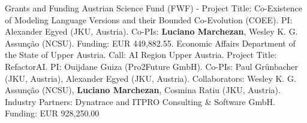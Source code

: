 \begin{rubric}{Grants and Funding}
\entry*[2025 -- 2029] Austrian Science Fund (FWF) - Project Title: Co-Existence of Modeling Language Versions and their Bounded Co-Evolution (COEE). PI: Alexander Egyed (JKU, Austria). Co-PIs: \textbf{Luciano Marchezan}, Wesley K. G. Assunção (NCSU). Funding: EUR 449,882.55.
\entry*[2025 -- 2028] Economic Affairs Department of the State of Upper Austria. Call: AI Region Upper Austria. Project Title: RefactorAI.
PI: Ouijdane Guiza (Pro2Future GmbH).
Co-PIs: Paul Grünbacher (JKU, Austria), Alexander Egyed (JKU, Austria). Collaborators: Wesley K. G. Assunção (NCSU), \textbf{Luciano Marchezan}, Cosmina Ratiu (JKU, Austria). Industry Partners: Dynatrace and ITPRO Consulting \& Software GmbH. 
Funding: EUR 928,250.00

\end{rubric}